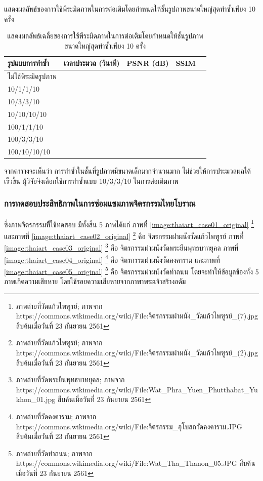 \documentclass[hidelinks, a4paper,12pt]{article}
\numberwithin{equation}{section}							%
\numberwithin{equation}{section}
\begin{document}
{\begin{table}[H]
		\caption{แสดงผลลัพธ์ของการใช้พีระมิดภาพในการต่อเติมโดยกำหนดให้ชั้นรูปภาพขนาดใหญ่สุดทำซ้ำเพียง 10 ครั้ง}
	\end{table}	
	\begin{table}[H]
		\centering
		\begin{tabular}[ht]{|l|c|c|c|c|}
			\hline
			รูปแบบการทำซ้ำ  & เวลาประมวล  (วินาที) & PSNR (dB) & SSIM \\
			\hline
			ไม่ใช้พีระมิดรูปภาพ &  &  &  \\
			10/1/1/10 &  &  &  \\
			10/3/3/10 &  &  & \\
			10/10/10/10 &  & &  \\
			100/1/1/10 &  &  & \\
			100/3/3/10 & & &  \\
			100/10/10/10 & & & \\
			\hline
		\end{tabular}
		\caption{แสดงผลลัพธ์เฉลี่ยของการใช้พีระมิดภาพในการต่อเติมโดยกำหนดให้ชั้นรูปภาพขนาดใหญ่สุดทำซ้ำเพียง 10 ครั้ง}
	\end{table}	

	จากตารางจะเห็นว่า การทำซ้ำในชั้นที่รูปภาพมีขนาดเล็กมากจำนวนมาก ไม่ช่วยให้การประมวลผลได้เร็วขึ้น ผู้วิจัยจึงเลือกใช้การทำซ้ำแบบ 10/3/3/10 ในการต่อเติมภาพ
	
	\subsubsection{การทดสอบประสิทธิภาพในการซ่อมแซมภาพจิตรกรรมไทยโบราณ}
	\hspace{1cm}ซึ่งภาพจิตรกรรมทีี่ใช้ทดสอบ มีทั้งสิ้น 5  ภาพได้แก่ ภาพที่ \ref{image:thaiart_case01_original} \footnote{ภาพถ่ายที่วัดแก้วไพฑูรย์; ภาพจาก  https://commons.wikimedia.org/wiki/File:จิตรกรรมฝาผนัง\_วัดแก้วไพฑูรย์\_(7).jpg สืบค้นเมื่อวันที่ 23 กันยายน 2561}   และภาพที่ \ref{image:thaiart_case02_original} \footnote{ภาพถ่ายที่วัดแก้วไพฑูรย์; ภาพจาก  https://commons.wikimedia.org/wiki/File:จิตรกรรมฝาผนัง\_วัดแก้วไพฑูรย์\_(2).jpg สืบค้นเมื่อวันที่ 23 กันยายน 2561} คือ จิตรกรรมฝาผนังวัดแก้วไพฑูรย์ ภาพที่ \ref{image:thaiart_case03_original} \footnote{ภาพถ่ายที่วัดพระยืนพุทธบาทยุคล; ภาพจาก  https://commons.wikimedia.org/wiki/File:Wat\_Phra\_Yuen\_Phutthabat\_Yukhon\_01.jpg สืบค้นเมื่อวันที่ 23 กันยายน 2561}  คือ จิตรกรรมฝาผนังวัดพระยืนพุทธบาทยุคล ภาพที่ \ref{image:thaiart_case04_original} \footnote{ภาพถ่ายที่วัดคงคาราม; ภาพจาก  https://commons.wikimedia.org/wiki/File:จิตรกรรม\_อุโบสถวัดคงคาราม.JPG สืบค้นเมื่อวันที่ 23 กันยายน 2561} คือ จิตรกรรมฝาผนังวัดคงคาราม และภาพที่ \ref{image:thaiart_case05_original} \footnote{ภาพถ่ายที่วัดท่าถนน; ภาพจาก  https://commons.wikimedia.org/wiki/File:Wat\_Tha\_Thanon\_05.JPG สืบค้นเมื่อวันที่ 23 กันยายน 2561} คือ จิตรกรรมฝาผนังวัดท่าถนน
	โดยจะทำให้ข้อมูลข้องทั้ง 5 ภาพเกิดความเสียหาย โดยใช้รอยความเสียหายจากภาพาพระเจ้าสร้างอดัม
	
}
\end{document}
